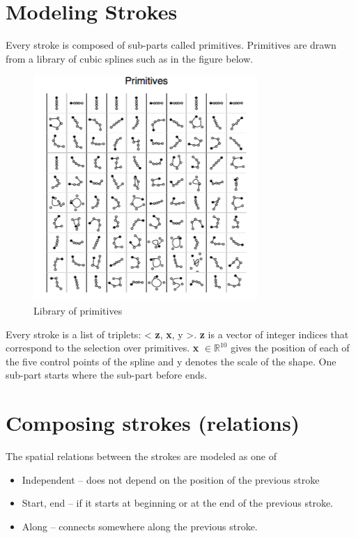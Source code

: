 \documentclass[11pt]{article}
\begin{document}
\section{Modeling Strokes}
\label{sec-5}
Every stroke is composed of sub-parts called primitives. 
Primitives are drawn from a library of cubic splines such as in the figure below. 
\begin{figure}[htb]
\centering
\includegraphics[width=.9\linewidth]{./md_slides/_images/bpl_plib.png}
\caption{Library of primitives}
\end{figure}

Every stroke is a list of triplets: < \textbf{z}, \textbf{x}, y >.
\textbf{z} is a vector of integer indices that correspond to the selection over primitives.
\textbf{x} $\in \mathbb{R}^{10}$ gives the position of each of the five control points of the spline and y denotes the scale of the shape. 
One sub-part starts where the sub-part before ends.

\section{Composing strokes (relations)}
\label{sec-6}
The spatial relations between the strokes are modeled as one of 
\begin{itemize}
\item Independent -- does not depend on the position of the previous stroke
\item Start, end -- if it starts at beginning or at the end of the previous stroke.
\item Along -- connects somewhere along the previous stroke.
\end{itemize}
\end{document}
